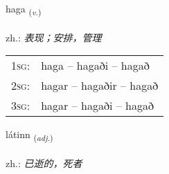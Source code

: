 \documentclass[frontgrid, backgrid]{flacards}\usepackage[]{graphicx}\usepackage[]{xcolor}
\begin{document}
\renewcommand{\flhead}{\vskip5pt \fboxsep=0pt {\small\bfseries\footnotesize Sagnorð | 动词}}
\renewcommand{\fcfoot}{\vskip5pt \fboxsep=0pt \hspace{2pt}{\small\bfseries\footnotesize 3K}}

\renewcommand{\blhead}{\vskip5pt {\small\bfseries\footnotesize Sagnorð | 动词 }}
\renewcommand{\bcfoot}{\vskip5pt \hspace{2pt}{\small\bfseries\footnotesize 3K}}


{haga \small{\textsubscript{(\textit{v.})}} \\[1ex] %
\textphonetic{[haːɣa]} \\
zh.: \emph{表现；安排，管理} \\  [2ex]
\renewcommand*{\arraystretch}{0.8}
\begin{tabular}{p{1cm}l}
\textsc{1sg}: & haga -- hagaði -- hagað \\ 
\textsc{2sg}: & hagar -- hagaðir -- hagað \\ 
\textsc{3sg}: & hagar -- hagaði -- hagað \\ 
\end{tabular}
}

\renewcommand{\flhead}{\vskip5pt \fboxsep=0pt {\small\bfseries\footnotesize Lýsingarorð | 形容词}}
\renewcommand{\fcfoot}{\vskip5pt \fboxsep=0pt \hspace{2pt}{\small\bfseries\footnotesize 3K}}

\renewcommand{\blhead}{\vskip5pt {\small\bfseries\footnotesize Lýsingarorð | 形容词 }}
\renewcommand{\bcfoot}{\vskip5pt \hspace{2pt}{\small\bfseries\footnotesize 3K}}


{látinn \small{\textsubscript{(\textit{adj.})}} \\[1ex] %
\textphonetic{[lauːtɪn]} \\
zh.: \emph{已逝的，死者} \\  [2ex]
\renewcommand*{\arraystretch}{0.8}
}
\end{document}

